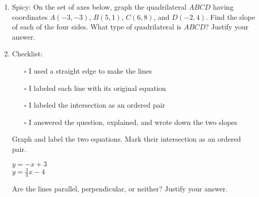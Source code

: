\documentclass[12pt, twoside]{article}
\begin{document}
\begin{enumerate}
  \item Spicy: On the set of axes below, graph the quadrilateral $ABCD$ having coordinates $A(-3,-3)$, $B(5,1)$, $C(6,8)$, and $D(-2,4)$. Find the slope of each of the four sides. What type of quadrilateral is $ABCD$? Justify your answer.
    \begin{flushright} %
    \end{flushright}

    \item Checklist:
    \begin{itemize}
      \item[$\square$]   I used a straight edge to make the lines
      \item[$\square$]   I labeled each line with its original equation
      \item[$\square$]   I labeled the intersection as an ordered pair
      \item[$\square$]   I answered the question, explained, and wrote down the two slopes
    \end{itemize}
    Graph and label the two equations. Mark their intersection as an ordered pair.
      \begin{multicols}{2}
        $y = -x+3$ \\
        $y=\frac{3}{4}x-4$
      \end{multicols}     \vspace{0.1cm}
      Are the lines parallel, perpendicular, or neither? Justify your answer.
      \vspace{2.5cm}
  
      \begin{center} %
      \end{center}
  

\end{enumerate}
\end{document}
